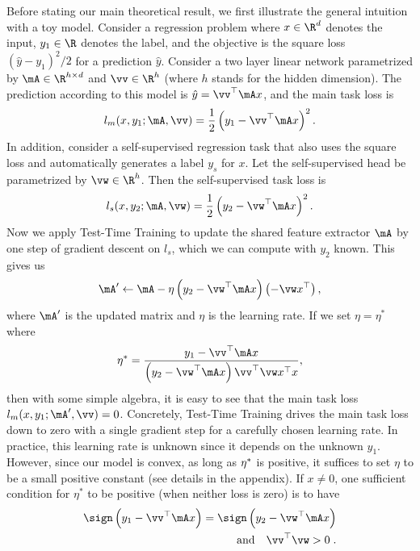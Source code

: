 Before stating our main theoretical result, we first illustrate the general intuition with a toy model.
Consider a regression problem where $x\in\R^d$ denotes the input,  $y_1\in\R$ denotes the label, and the objective is the square loss
$(\hat{y}-y_1)^2/2$ for a prediction $\hat{y}$.  
Consider a two layer linear network parametrized by $\mA\in\R^{h\times d}$ and $\vv \in\R^h$ (where $h$
stands for the hidden dimension).  
The prediction according to this model
is $\hat{y}=\vv^\top \mA x$, and the main task loss is
\begin{equation}
    l_m(x, y_1; \mA, \vv) = \frac{1}{2}\left(y_1 - \vv^ \top \mA x\right)^2.
\end{equation}
In addition, consider a self-supervised regression task that also uses the square loss and automatically generates a label $y_s$ for $x$. 
Let the self-supervised head be parametrized by $\vw\in\R^h$.  Then the self-supervised task loss is
\begin{equation}
    l_s(x, y_2; \mA, \vw) = \frac{1}{2}\left(y_2 - \vw^\top\mA x\right)^2.
\end{equation}
Now we apply Test-Time Training to update the shared feature extractor $\mA$ by
one step of gradient descent on $l_s$, which we can compute with $y_2$ known.
This gives us
\begin{equation}
    \mA' \leftarrow \mA - \eta\left( y_2-\vw^\top\mA x \right) \left(-\vw x^\top\right),
\end{equation}
where $\mA'$ is the updated matrix and $\eta$ is the learning rate.
If we set $\eta = \eta^*$ where
\begin{equation}
\label{magic_lr}
\eta^* = \frac{y_1 - \vv^\top \mA x}{\left( y_2 - \vw^\top \mA x \right)
	\vv^\top \vw x^\top x},
\end{equation}
then with some simple algebra, it is easy to see that the main task loss 
$l_m(x, y_1; \mA', \vv) = 0$.  
Concretely, Test-Time Training drives the main task loss down to zero with a single gradient step for a carefully chosen learning rate. 
In practice, this learning rate is unknown since it depends on the unknown $y_1$.
However, since our model is convex, as long as $\eta^*$ is positive, it suffices to set $\eta$ to be a small positive constant (see details in the appendix).
If $x \neq 0$, one sufficient condition for $\eta^*$ to be positive (when neither loss is zero) is to have
\begin{align}
\label{equal_sign}
    \sign\left( y_1 - \vv^\top \mA x \right) = \sign\left( y_2 - \vw^\top \mA x \right)\\
    \text{and}\quad
    \vv^\top \vw > 0 \;.
\end{align}
